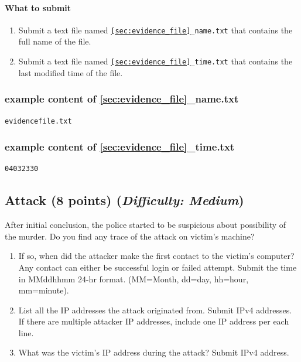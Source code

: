 \documentclass[letterpaper,12pt]{report}
\begin{document}
\paragraph{What to submit}
\begin{enumerate}
\item Submit a text file named \texttt{\ref{sec:evidence_file}\_name.txt} that contains the full name of the file.
\item Submit a text file named \texttt{\ref{sec:evidence_file}\_time.txt} that contains the last modified time of the file.
\end{enumerate}

\subsubsection*{example content of {\ref{sec:evidence_file}\_name.txt}}
\begin{mdframed}
\begin{Verbatim}
evidencefile.txt
\end{Verbatim}
\end{mdframed}

\subsubsection*{example content of {\ref{sec:evidence_file}\_time.txt}}
\begin{mdframed}
\begin{Verbatim}
04032330
\end{Verbatim}
\end{mdframed}

\subsection{Attack (8 points)    \hfill\rm\normalsize (\emph{Difficulty: Medium})}
\label{sec:attack}
After initial conclusion, the police started to be suspicious about possibility of the murder. Do you find any trace of the attack on victim's machine? 

\begin{enumerate}
\item If so, when did the attacker make the first contact to the victim's computer? Any contact can either be successful login or failed attempt. Submit the time in MMddhhmm 24-hr format. (MM=Month, dd=day, hh=hour, mm=minute).
\item List all the IP addresses the attack originated from. Submit IPv4 addresses. If there are multiple attacker IP addresses, include one IP address per each line.
\item What was the victim's IP address during the attack? Submit IPv4 address.
\end{enumerate}
\end{document}
